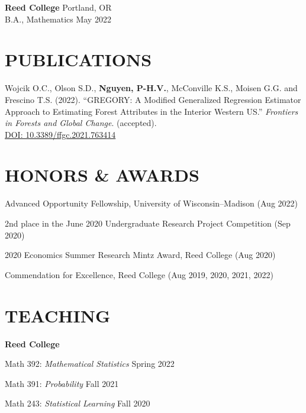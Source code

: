 \documentclass[margin]{res}
\def\pvn{\textbf{Nguyen, P-H.V.}}
\begin{document}
\begin{resume}
                {\bf Reed College} \hfill Portland, OR \\
                B.A., Mathematics \hfill May 2022 
  
  


\section{PUBLICATIONS}

Wojcik O.C., Olson S.D., \pvn, McConville K.S., Moisen G.G. and Frescino T.S. (2022). ``GREGORY: A Modified Generalized Regression Estimator Approach to Estimating Forest Attributes in the Interior Western US.'' \textit{Frontiers in Forests and Global Change}. (accepted). \\ \href{https://doi.org/10.3389/ffgc.2021.763414}{DOI: 10.3389/ffgc.2021.763414}



\section{HONORS \& AWARDS} 

Advanced Opportunity Fellowship, University of Wisconsin--Madison \hfill (Aug 2022)

2nd place in the June 2020 Undergraduate Research Project Competition \hfill (Sep 2020)

2020 Economics Summer Research Mintz Award, Reed College \hfill (Aug 2020)

Commendation for Excellence, Reed College \hfill (Aug 2019, 2020, 2021, 2022)

\section{TEACHING}

\textbf{Reed College} 

Math 392: {\it Mathematical Statistics} \hfill Spring 2022

Math 391: {\it Probability} \hfill Fall 2021

Math 243: {\it Statistical Learning} \hfill Fall 2020


\end{resume}
\end{document}
